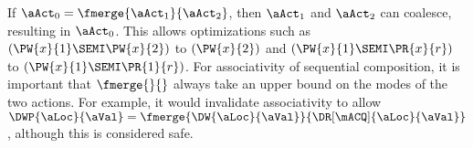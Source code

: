
If $\aAct_0=\fmerge{\aAct_1}{\aAct_2}$, then $\aAct_1$ and $\aAct_2$ can
coalesce, resulting in $\aAct_0$.  This allows optimizations such as
$(\PW{x}{1}\SEMI \PW{x}{2})$ to $(\PW{x}{2})$ and
$(\PW{x}{1}\SEMI \PR{x}{r})$ to $(\PW{x}{1}\SEMI \PR{1}{r})$.  For
associativity of sequential composition, it is important that $\fmerge{}{}$
always take an upper bound on the modes of the two actions.  For example, it
would invalidate associativity to allow
$\DWP{\aLoc}{\aVal}=\fmerge{\DW{\aLoc}{\aVal}}{\DR[\mACQ]{\aLoc}{\aVal}}$,
although this is considered safe.

